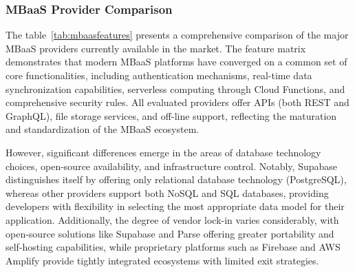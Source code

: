 \subsubsection{MBaaS Provider Comparison}

The table~\ref{tab:mbaasfeatures} presents a comprehensive comparison of the major MBaaS providers currently available in the market. The feature matrix demonstrates that modern MBaaS platforms have converged on a common set of core functionalities, including authentication mechanisms, real-time data synchronization capabilities, serverless computing through Cloud Functions, and comprehensive security rules. All evaluated providers offer APIs (both REST and GraphQL), file storage services, and off-line support, reflecting the maturation and standardization of the MBaaS ecosystem.

However, significant differences emerge in the areas of database technology choices, open-source availability, and infrastructure control. Notably, Supabase distinguishes itself by offering only relational database technology (PostgreSQL), whereas other providers support both NoSQL and SQL databases, providing developers with flexibility in selecting the most appropriate data model for their application. Additionally, the degree of vendor lock-in varies considerably, with open-source solutions like Supabase and Parse offering greater portability and self-hosting capabilities, while proprietary platforms such as Firebase and AWS Amplify provide tightly integrated ecosystems with limited exit strategies.

